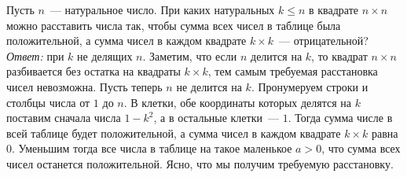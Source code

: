 \problem
Пусть $n$~--- натуральное число.
При каких натуральных $k \leq n$ в квадрате $n \times n$ можно расставить числа
так, чтобы сумма всех чисел в таблице была положительной, а сумма чисел в каждом
квадрате $k \times k$~--- отрицательной?
\solution
\emph{Ответ:} при $k$ не делящих $n$.
Заметим, что если $n$ делится на $k$, то квадрат $n \times n$ разбивается без
остатка на квадраты $k \times k$, тем самым требуемая расстановка чисел
невозможна.
Пусть теперь $n$ не делится на $k$.
Пронумеруем строки и столбцы числа от $1$ до $n$.
В клетки, обе координаты которых делятся на $k$ поставим сначала числа
$1 - k^2$, а в остальные клетки~--- $1$.
Тогда сумма числе в всей таблице будет положительной, а сумма чисел в каждом
квадрате $k \times k$ равна $0$.
Уменьшим тогда все числа в таблице на такое маленькое $a > 0$, что сумма всех
чисел останется положительной.
Ясно, что мы получим требуемую расстановку.
\endproblem
